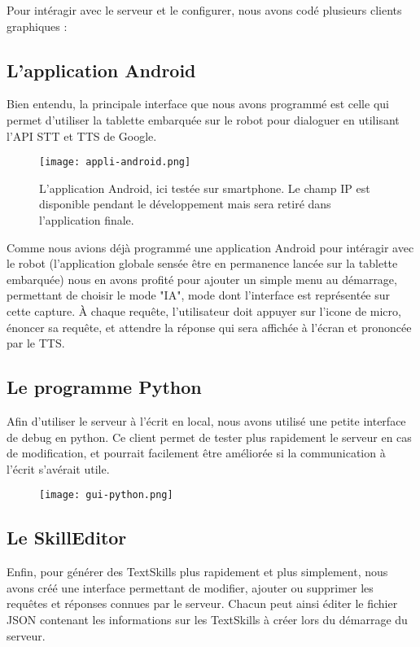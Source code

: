 \documentclass[a4paper,10pt]{report}
\begin{document}
        {Pour intéragir avec le serveur et le configurer, nous avons codé plusieurs clients graphiques :}
        \subsection{L'application Android}
          {Bien entendu, la principale interface que nous avons programmé est celle qui permet d'utiliser la tablette embarquée sur le robot pour dialoguer en utilisant l'API STT et TTS de Google.}
          \begin{figure}[h]
            \centering
            \texttt{[image: appli-android.png]}
            \caption{L'application Android, ici testée sur smartphone. Le champ IP est disponible pendant le développement mais sera retiré dans l'application finale.}
          \end{figure}

          {Comme nous avions déjà programmé une application Android pour intéragir avec le robot (l'application globale sensée être en permanence lancée sur la tablette embarquée) nous en avons profité pour ajouter un simple menu au démarrage, permettant de choisir le mode "IA", mode dont l'interface est représentée sur cette capture. À chaque requête, l'utilisateur doit appuyer sur l'icone de micro, énoncer sa requête, et attendre la réponse qui sera affichée à l'écran et prononcée par le TTS.}


        \subsection{Le programme Python}
          {Afin d'utiliser le serveur à l'écrit en local, nous avons utilisé une petite interface de debug en python. Ce client permet de tester plus rapidement le serveur en cas de modification, et pourrait facilement être améliorée si la communication à l'écrit s'avérait utile.}
          \begin{figure}[h]
            \texttt{[image: gui-python.png]}
            \centering
          \end{figure}

        \subsection{Le SkillEditor}
          {Enfin, pour générer des TextSkills plus rapidement et plus simplement, nous avons créé une interface permettant de modifier, ajouter ou supprimer les requêtes et réponses connues par le serveur. Chacun peut ainsi éditer le fichier JSON contenant les informations sur les TextSkills à créer lors du démarrage du serveur.}
          \begin{figure}[h]
            \noindent
            \centering
          \end{figure}
\end{document}
